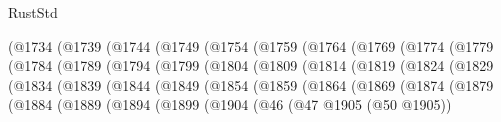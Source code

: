 \begin{lexlean}{RustStd}
\begin{coremodule}
                    (@1734
                      (@1739
                        (@1744
                          (@1749
                            (@1754
                              (@1759
                                (@1764
                                  (@1769
                                    (@1774
                                      (@1779
                                        (@1784
                                          (@1789
                                            (@1794
                                              (@1799
                                                (@1804
                                                  (@1809
                                                    (@1814
                                                      (@1819
                                                        (@1824
                                                          (@1829
                                                            (@1834
                                                              (@1839
                                                                (@1844
                                                                  (@1849
                                                                    (@1854
                                                                      (@1859
                                                                        (@1864
                                                                          (@1869
                                                                            (@1874
                                                                              (@1879
                                                                                (@1884
                                                                                  (@1889
                                                                                    (@1894
                                                                                      (@1899
                                                                                        (@1904
                                                                                          (@46
                                                                                            (@47
                                                                                              @1905
                                                                                              (@50
                                                                                                @1905))

\end{coremodule}
\end{lexlean}
